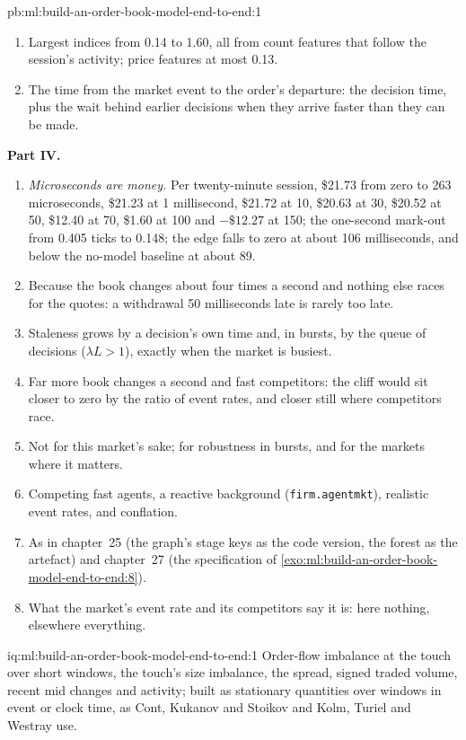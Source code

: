 \begin{solution}{pb:ml:build-an-order-book-model-end-to-end:1}
\begin{enumerate}[resume]
lose.
\item Largest indices from 0.14 to 1.60, all from count features that follow the session's activity; price features at most 0.13.
\item The time from the market event to the order's departure: the decision time, plus the wait behind earlier decisions when
they arrive faster than they can be made.
\end{enumerate}
\textbf{Part IV.}
\begin{enumerate}[resume]
\item \emph{Microseconds are money.} Per twenty-minute session, \$21.73 from zero to 263 microseconds, \$21.23 at 1 millisecond,
\$21.72 at 10, \$20.63 at 30, \$20.52 at 50, \$12.40 at 70, \$1.60 at 100 and $-\$12.27$ at 150; the one-second mark-out from
0.405 ticks to 0.148; the edge falls to zero at about 106 milliseconds, and below the no-model baseline at about 89.
\item Because the book changes about four times a second and nothing else races for the quotes: a withdrawal 50 milliseconds late
is rarely too late.
\item Staleness grows by a decision's own time and, in bursts, by the queue of decisions ($\lambda L>1$), exactly when the market
is busiest.
\item Far more book changes a second and fast competitors: the cliff would sit closer to zero by the ratio of event rates, and
closer still where competitors race.
\item Not for this market's sake; for robustness in bursts, and for the markets where it matters.
\item Competing fast agents, a reactive background (\texttt{firm.agentmkt}), realistic event rates, and conflation.
\item As in chapter~25 (the graph's stage keys as the code version, the forest as the artefact) and chapter~27 (the specification
of \cref{exo:ml:build-an-order-book-model-end-to-end:8}).
\item What the market's event rate and its competitors say it is: here nothing, elsewhere everything.
\end{enumerate}
\end{solution}

\begin{solution}{iq:ml:build-an-order-book-model-end-to-end:1}
Order-flow imbalance at the touch over short windows, the touch's size imbalance, the spread, signed traded volume, recent mid
changes and activity; built as stationary quantities over windows in event or clock time, as Cont, Kukanov and Stoikov and Kolm,
Turiel and Westray use.
\end{solution}

